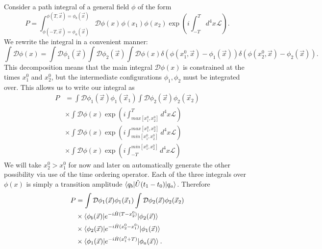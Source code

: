Consider a path integral of a general field $\phi$ of the form
\begin{equation}
P = \int^{\phi(T, \vec{x}) = \phi_b(\vec{x})}_{\phi(-T, \vec{x}) = \phi_a(\vec{x})} \mathcal{D} \phi(x) \hspace{1pt}  \phi(x_1) \phi(x_2) \exp \left( i \int_{-T}^T d^4 x \hspace{1pt} \mathscr{L} \right).
\end{equation}
We rewrite the integral in a convenient manner:
\begin{equation}
\int \mathcal{D} \phi(x) = \int \mathcal{D}\phi_1(\vec{x}) \int \mathcal{D} \phi_2 (\vec{x}) \int \mathcal{D} \phi(x) \delta(\phi(x_1^0, \vec{x}) - \phi_1(\vec{x})) \delta(\phi(x_2^0, \vec{x}) - \phi_2(\vec{x})).
\end{equation}
This decomposition means that the main integral $\mathcal{D} \phi(x)$ is constrained at the times $x_1^0$ and $x_2^0$, but the intermediate configurations $\phi_1, \phi_2$ must be integrated over. This allows us to write our integral as
\begin{equation}
\begin{split}
P &= \int \mathcal{D} \phi_1(\vec{x}) \phi_1(\vec{x}_1) \int \mathcal{D} \phi_2(\vec{x}) \phi_2(\vec{x}_2) \\
&\times  \int \mathcal{D} \phi(x) \exp \left(i \int_{max[x_1^0, x_2^0]}^T d^4 x \mathscr{L}\right) \\
& \times \int \mathcal{D} \phi(x) \exp \left(i \int_{min [x_1^0, x_2^0]}^{max[x_1^0, x_2^0]} d^4 x \mathscr{L}\right) \\
& \times \int \mathcal{D} \phi(x) \exp \left(i \int_{-T}^{min [x_1^0, x_2^0]} d^4 x \mathscr{L}\right)
\end{split}
\end{equation}
We will take $x_2^0 > x_1^0$ for now and later on automatically generate the other possibility via use of the time ordering operator. Each of the three integrals over $\phi(x)$ is simply a transition amplitude $\mathinner{\langle q_b\vert\hat{U}(t_1 - t_0)\vert q_a\rangle}_{}$. Therefore
\begin{equation}
\begin{split}
P &= \int \mathcal{D} \phi_1(\vec{x}) \phi_1(\vec{x}_1) \int \mathcal{D} \phi_2(\vec{x}) \phi_2(\vec{x}_2) \\
& \times \mathinner{\langle\phi_b(\vec{x})\vert e^{-i \hat{H} (T - x_2^0)}\vert\phi_2(\vec{x})\rangle}_{} \\
& \times \mathinner{\langle\phi_2(\vec{x})\vert e^{-i \hat{H} (x_2^0 - x_1^0)}\vert\phi_1(\vec{x})\rangle}_{} \\
&\times \mathinner{\langle\phi_1(\vec{x})\vert e^{-i \hat{H} (x_1^0+T)}\vert\phi_a(\vec{x})\rangle}_{}. 
\end{split}
\end{equation}
